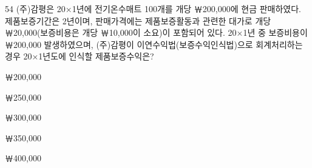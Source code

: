 \begin{question}{54}
(주)감평은 20×1년에 전기온수매트 100개를 개당 ￦200,000에 현금 판매하였다. 제품보증기간은 2년이며, 판매가격에는 제품보증활동과 관련한 대가로 개당 ￦20,000(보증비용은 개당 ￦10,000이 소요)이 포함되어 있다. 20×1년 중 보증비용이 ￦200,000 발생하였으며, (주)감평이 이연수익법(보증수익인식법)으로 회계처리하는 경우 20×1년도에 인식할 제품보증수익은?
\begin{choices}
  \item ￦200,000
  \item ￦250,000
  \item ￦300,000
  \item ￦350,000
  \item ￦400,000
\end{choices}
\end{question}
